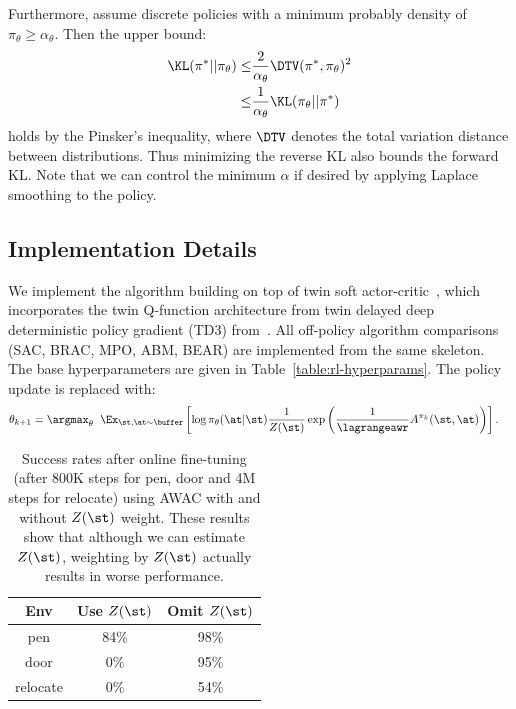 Furthermore, assume discrete policies with a minimum probably density of $\pi_\theta \geq \alpha_\theta$. Then the upper bound:
\begin{align}
    \KL(\pi^*||\pi_\theta) \leq & \frac{2}{\alpha_\theta} \DTV(\pi^*, \pi_\theta)^2 \\
    \leq & \frac{1}{\alpha_\theta} \KL(\pi_\theta||\pi^*)
\end{align}
holds by the Pinsker's inequality, where $\DTV$ denotes the total variation distance between distributions. Thus minimizing the reverse KL also bounds the forward KL. Note that we can control the minimum $\alpha$ if desired by applying Laplace smoothing to the policy.

\subsection{Implementation Details} \label{sec:implementation}

We implement the algorithm building on top of twin soft actor-critic~\citep{haarnoja2018sac}, which incorporates the twin Q-function architecture from twin delayed deep deterministic policy gradient (TD3) from~\citet{fujimoto2018td3}. All off-policy algorithm comparisons (SAC, BRAC, MPO, ABM, BEAR) are implemented from the same skeleton. The base hyperparameters are given in Table~\ref{table:rl-hyperparams}. The policy update is replaced with:
\begin{align}
    \theta_{k+1} = \argmax_\theta \; & \; \Ex_{\st, \at \sim \buffer}
    \left[\log \pi_\theta(\at|\st) \frac{1}{Z(\st)}  \exp \left(\frac{1}{\lagrangeawr}A^{\pi_k}(\st, \at) \right)\right].
\end{align}

\begin{table}[h!]
\footnotesize
\begin{tabular}{c|c|c}
Env      & \shortstack{Use \\ $Z(\st)$} & \shortstack{Omit \\ $Z(\st)$} \\ \hline
pen      & 84\%      & 98\%    \\
door     & 0\%      & 95\%    \\
relocate & 0\%      & 54\%
\end{tabular}
\caption{Success rates after online fine-tuning (after 800K steps for pen, door and 4M steps for relocate) using AWAC with and without $Z(\st)$ weight. These results show that although we can estimate $Z(\st)$, weighting by $Z(\st)$ actually results in worse performance.}
\label{fig:z}
\end{table}

